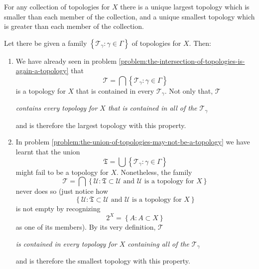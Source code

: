 \begin{problem}
  For any collection of topologies for \(X\) there is a unique largest topology
  which is smaller than each member of the collection, and a unique smallest
  topology which is greater than each member of the collection.
  \label{problem:smallest-and-largest-topologies}
\end{problem}

\begin{solution}
  Let there be given a family
  \(\left\{\mathcal{T}_{\gamma}:\gamma\in\Gamma\right\}\) of topologies for
  \(X\). Then:
  \begin{enumerate}
    \item
      We have already seen in problem
      \ref{problem:the-intersection-of-topologies-is-again-a-topology} that
      \[
        \mathcal{T}=\bigcap\left\{\mathcal{T}_{\gamma}:\gamma\in\Gamma\right\}
      \]
      is a topology for \(X\) that is contained in every
      \(\mathcal{T}_{\gamma}\). Not only that, \(\mathcal{T}\)
      \begin{center}
        \textit{contains every topology for \(X\) that is contained in all of the \(\mathcal{T}_{\gamma}\)}
      \end{center}
      and is therefore the largest topology with this property.
    \item
      In problem
      \ref{problem:the-union-of-topologies-may-not-be-a-topology}
      we have learnt that the union
      \begin{equation}
        \mathfrak{T}=\bigcup\left\{\mathcal{T}_{\gamma}:\gamma\in\Gamma\right\}
        \label{eq:the-union-of-the-members-of-t-gamma}
      \end{equation}
      might fail to be a topology for \(X\). Nonetheless, the family
      \begin{equation}
        \mathcal{T}=\bigcap\left\{\mathcal{U}:\mathfrak{T}\subset\mathcal{U}\text{ and }\mathcal{U}\text{ is a topology for }X\right\}
      \end{equation}
      never does so (just notice how
      \[
        \left\{\mathcal{U}:\mathfrak{T}\subset\mathcal{U}\text{ and }\mathcal{U}\text{ is a topology for }X\right\}
      \]
      is not empty by recognizing 
      \[
        2^{X}=\left\{A:A\subset{X}\right\}
      \]
      as one of its members). By its very definition, \(\mathcal{T}\)
      \begin{center}
        \textit{is contained in every topology for \(X\) containing all of the \(\mathcal{T}_{\gamma}\)}
      \end{center}
      and is therefore the smallest topology with this property.
  \end{enumerate}
\end{solution}
